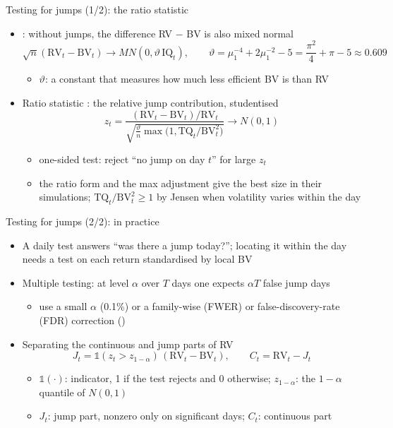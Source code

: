 \begin{frame}{Testing for jumps (1/2): the ratio statistic}
\itemsize{\small}
\begin{itemize}
    \item {}: without jumps, the difference RV $-$ BV is also mixed normal
    \[ \sqrt n(\mathrm{RV}_t - \mathrm{BV}_t) \to MN(0, \vartheta\,\mathrm{IQ}_t), \qquad \vartheta = \mu_1^{-4} + 2\mu_1^{-2} - 5 = \frac{\pi^2}{4} + \pi - 5 \approx 0.609 \]
    \begin{itemize}
        \item $\vartheta$: a constant that measures how much less efficient BV is than RV
    \end{itemize}
    \item Ratio statistic : the relative jump contribution, studentised
    \[ z_t = \frac{(\mathrm{RV}_t - \mathrm{BV}_t)/\mathrm{RV}_t}{\sqrt{\frac{\vartheta}{n}\max\big(1, \mathrm{TQ}_t/\mathrm{BV}_t^2\big)}} \to N(0, 1) \]
    \begin{itemize}
        \item one-sided test: reject ``no jump on day $t$'' for large $z_t$
        \item the ratio form and the max adjustment give the best size in their simulations; $\mathrm{TQ}_t/\mathrm{BV}_t^2 \ge 1$ by Jensen when volatility varies within the day
    \end{itemize}
\end{itemize}
\end{frame}

\begin{frame}{Testing for jumps (2/2): in practice}
\itemsize{\small}
\begin{itemize}
    \item A daily test answers ``was there a jump today?''; locating it within the day needs a test on each return standardised by local BV 
    \item Multiple testing: at level $\alpha$ over $T$ days one expects $\alpha T$ false jump days
    \begin{itemize}
        \item use a small $\alpha$ (0.1\%) or a family-wise (FWER) or false-discovery-rate (FDR) correction ()
    \end{itemize}
    \item Separating the continuous and jump parts of RV 
    \[ J_t = \mathbb 1(z_t > z_{1-\alpha})\,(\mathrm{RV}_t - \mathrm{BV}_t), \qquad C_t = \mathrm{RV}_t - J_t \]
    \begin{itemize}
        \item $\mathbb 1(\cdot)$: indicator, 1 if the test rejects and 0 otherwise; $z_{1-\alpha}$: the $1-\alpha$ quantile of $N(0, 1)$
        \item $J_t$: jump part, nonzero only on significant days; $C_t$: continuous part
    \end{itemize}
\end{itemize}
\end{frame}

